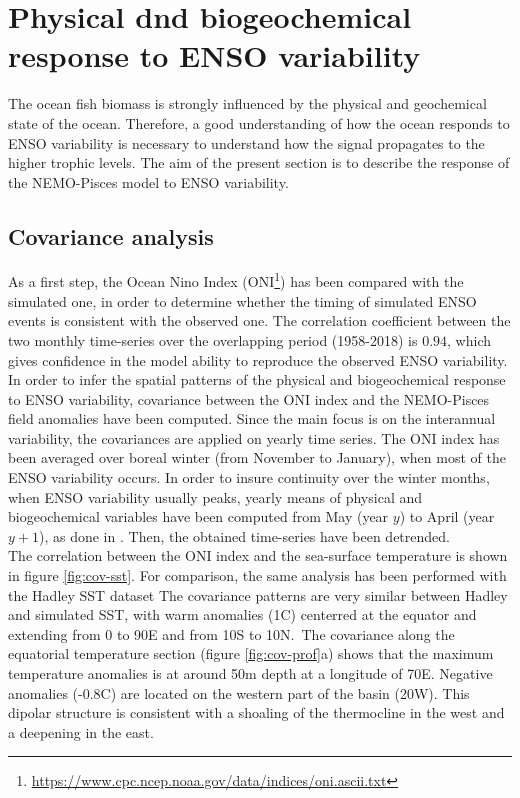 \section{Physical dnd biogeochemical response to ENSO variability}
\label{sec:pisces}

The ocean fish biomass is strongly influenced by the physical and geochemical state of the ocean. Therefore, a good understanding of how the ocean responds to ENSO variability is necessary to understand how the signal propagates to the higher trophic levels. The aim of the present section is to describe the response of the NEMO-Pisces model to ENSO variability. \\

\subsection{Covariance analysis}

As a first step, the Ocean Nino Index (ONI\footnote{\url{https://www.cpc.ncep.noaa.gov/data/indices/oni.ascii.txt}}) has been compared with the simulated one, in order to determine whether the timing of simulated ENSO events is consistent with the observed one. The correlation coefficient between the two monthly time-series over the overlapping period (1958-2018) is $0.94$, which gives confidence in the model ability to reproduce the observed ENSO variability. \\

In order to infer the spatial patterns of the physical and biogeochemical response to ENSO variability, covariance between the ONI index and the NEMO-Pisces field anomalies have been computed. 
Since the main focus is on the interannual variability, the covariances are applied on yearly time series. The ONI index has been averaged over boreal winter (from November to January), when most of the ENSO variability occurs. In order to insure continuity over the winter months, when ENSO variability usually peaks, yearly means of physical and biogeochemical variables have been computed from May (year $y$) to April (year $y + 1$), as done in \cite{racaultImpactNinoVariability2017}. Then, the obtained time-series have been detrended.\\

The correlation between the ONI index and the sea-surface temperature is shown in figure \ref{fig:cov-sst}. For comparison, the same analysis has been performed with the Hadley SST dataset \citep{raynerGlobalAnalysesSea2003}
The covariance patterns are very similar between Hadley and simulated SST, with warm anomalies (1\degree C) centerred at the equator and extending from 0 to 90E and from 10S to 10N.\ 
The covariance along the equatorial temperature section (figure \ref{fig:cov-prof}a) shows that the maximum temperature anomalies is at around 50m depth at a longitude of 70E. Negative anomalies (-0.8\degree C) are located on the western part of the basin (20W). This dipolar structure is consistent with a shoaling of the thermocline in the west and a deepening in the east.\\

